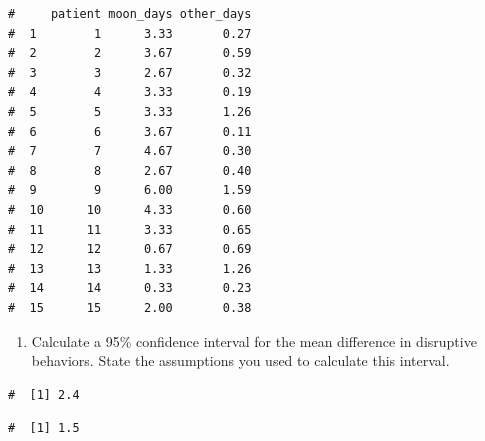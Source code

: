 \documentclass[letterpaper,11pt,twoside,]{pinp}
\providecommand{\tightlist}{%
  \setlength{\itemsep}{0pt}\setlength{\parskip}{0pt}}
\begin{document}
\begin{ShadedResult}
\begin{verbatim}
#     patient moon_days other_days
#  1        1      3.33       0.27
#  2        2      3.67       0.59
#  3        3      2.67       0.32
#  4        4      3.33       0.19
#  5        5      3.33       1.26
#  6        6      3.67       0.11
#  7        7      4.67       0.30
#  8        8      2.67       0.40
#  9        9      6.00       1.59
#  10      10      4.33       0.60
#  11      11      3.33       0.65
#  12      12      0.67       0.69
#  13      13      1.33       1.26
#  14      14      0.33       0.23
#  15      15      2.00       0.38
\end{verbatim}
\end{ShadedResult}

\begin{enumerate}
\def\labelenumi{\alph{enumi}.}
\tightlist
\item
  Calculate a 95\% confidence interval for the mean difference in
  disruptive behaviors. State the assumptions you used to calculate this
  interval.
\end{enumerate}

\begin{Shaded}
\begin{Highlighting}[]
\OtherTok{\textless{}{-}} 
\end{Highlighting}
\end{Shaded}

\begin{ShadedResult}
\begin{verbatim}
#  [1] 2.4
\end{verbatim}
\end{ShadedResult}

\begin{Shaded}
\begin{Highlighting}[]
\OtherTok{\textless{}{-}} 
\end{Highlighting}
\end{Shaded}

\begin{ShadedResult}
\begin{verbatim}
#  [1] 1.5
\end{verbatim}
\end{ShadedResult}

\begin{Shaded}
\begin{Highlighting}[]
\OtherTok{\textless{}{-}} 
\end{Highlighting}
\end{Shaded}
\end{document}
